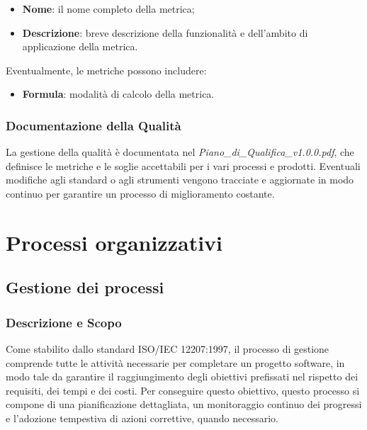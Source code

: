\documentclass[10pt]{article}
\begin{document}
\begin{justify}
\begin{itemize}
    \item \textbf{Nome}: il nome completo della metrica;
    \item \textbf{Descrizione}: breve descrizione della funzionalità e dell'ambito di applicazione della metrica.
\end{itemize}

Eventualmente, le metriche possono includere:
\begin{itemize}
    \item \textbf{Formula}: modalità di calcolo della metrica.
\end{itemize}
    
    \subsubsection{Documentazione della Qualità}
    La gestione della qualità è documentata nel \textit{Piano\_di\_Qualifica\_v1.0.0.pdf}, che definisce le metriche e le soglie accettabili per i vari processi e prodotti. Eventuali modifiche agli standard o agli strumenti vengono tracciate e aggiornate in modo continuo per garantire un processo di miglioramento costante.

\newpage
\section{Processi organizzativi}
    \subsection{Gestione dei processi}

    \subsubsection{Descrizione e Scopo}
    Come stabilito dallo standard ISO/IEC 12207:1997, il processo di gestione comprende tutte le attività necessarie per completare un progetto software, in modo tale da garantire il raggiungimento degli obiettivi prefissati nel rispetto dei requisiti, dei tempi e dei costi. Per conseguire questo obiettivo, questo processo si compone di una pianificazione dettagliata, un monitoraggio continuo dei progressi e l'adozione tempestiva di azioni correttive, quando necessario.


\end{justify}
\end{document}
